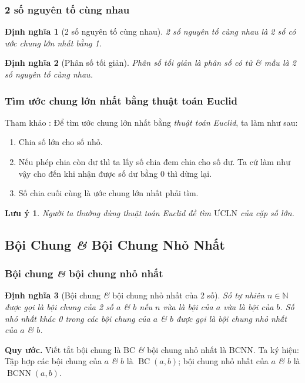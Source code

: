 \documentclass{article}
\numberwithin{equation}{section}
\newtheorem{definition}{Định nghĩa}[section]
\newtheorem{remark}{Lưu ý}[section]
\begin{document}
\subsubsection{2 số nguyên tố cùng nhau}

\begin{definition}[2 số nguyên tố cùng nhau]
	\emph{2 số nguyên tố cùng nhau} là 2 số có ước chung lớn nhất bằng 1.
\end{definition}

\begin{definition}[Phân số tối giản]
	\emph{Phân số tối giản} là phân số có tử \textit{\&} mẫu là 2 số nguyên tố cùng nhau.
\end{definition}

\subsubsection{Tìm ước chung lớn nhất bằng thuật toán Euclid}
Tham khảo \cite[p. 52]{Thai_Anh_Dat_Ha_Loan_Nam_Quang_Toan_6_tap_1}: Để tìm ước chung lớn nhất bằng \textit{thuật toán Euclid}, ta làm như sau:
\begin{enumerate}
	\item Chia số lớn cho số nhỏ.
	\item Nếu phép chia còn dư thì ta lấy số chia đem chia cho số dư. Ta cứ làm như vậy cho đến khi nhận được số dư bằng 0 thì dừng lại.
	\item Số chia cuối cùng là ước chung lớn nhất phải tìm.
\end{enumerate}

\begin{remark}
	Người ta thường dùng thuật toán Euclid đề tìm $\mbox{ƯCLN}$ của cặp số lớn.
\end{remark}

\subsection{Bội Chung \textit{\&} Bội Chung Nhỏ Nhất}

\subsubsection{Bội chung \textit{\&} bội chung nhỏ nhất}

\begin{definition}[Bội chung \textit{\&} bội chung nhỏ nhất của 2 số]
	Số tự nhiên $n\in\mathbb{N}$ được gọi là \emph{bội chung} của 2 số $a$ \textit{\&} $b$ nếu $n$ vừa là bội của $a$ vừa là bội của $b$. Số nhỏ nhất khác 0 trong các bội chung của $a$ \textit{\&} $b$ được gọi là \emph{bội chung nhỏ nhất} của $a$ \textit{\&} $b$.
\end{definition}
\noindent\textbf{Quy ước.} Viết tắt bội chung là BC \textit{\&} bội chung nhỏ nhất là BCNN. Ta ký hiệu: Tập hợp các bội chung của $a$ \textit{\&} $b$ là $\operatorname{BC}(a,b)$; bội chung nhỏ nhất của $a$ \textit{\&} $b$ là $\operatorname{BCNN}(a,b)$.  
\end{document}
